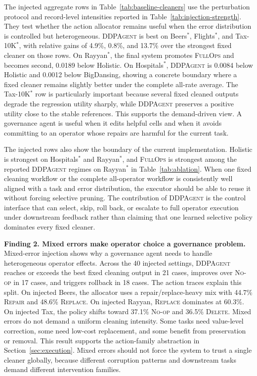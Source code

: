 \documentclass[sigconf, nonacm]{acmart}
\newcommand{\sys}{\textsc{DDPAgent}\xspace}
\newcommand{\noop}{\textsc{No-op}\xspace}
\newcommand{\repair}{\textsc{Repair}\xspace}
\newcommand{\deleteop}{\textsc{Delete}\xspace}
\newcommand{\replaceop}{\textsc{Replace}\xspace}
\newcommand{\fullops}{\textsc{FullOps}\xspace}
\begin{document}
The injected aggregate rows in Table~\ref{tab:baseline-cleaners} use the perturbation protocol and record-level intensities reported in Table~\ref{tab:injection-strength}. They test whether the action allocator remains useful when the error distribution is controlled but heterogeneous. \sys is best on Beers$^*$, Flights$^*$, and Tax-10K$^*$, with relative gains of 4.9\%, 0.8\%, and 13.7\% over the strongest fixed cleaner on those rows. On Rayyan$^*$, the final system promotes \fullops and becomes second, 0.0189 below Holistic. On Hospitals$^*$, \sys is 0.0084 below Holistic and 0.0012 below BigDansing, showing a concrete boundary where a fixed cleaner remains slightly better under the complete all-rate average. The Tax-10K$^*$ row is particularly important because several fixed cleaned outputs degrade the regression utility sharply, while \sys preserves a positive utility close to the stable references. This supports the demand-driven view. A governance agent is useful when it edits helpful cells and when it avoids committing to an operator whose repairs are harmful for the current task.

The injected rows also show the boundary of the current implementation. Holistic is strongest on Hospitals$^*$ and Rayyan$^*$, and \fullops is strongest among the reported \sys regimes on Rayyan$^*$ in Table~\ref{tab:ablation}. When one fixed cleaning workflow or the complete all-operator workflow is consistently well aligned with a task and error distribution, the executor should be able to reuse it without forcing selective pruning. The contribution of \sys is the control interface that can select, skip, roll back, or escalate to full operator execution under downstream feedback rather than claiming that one learned selective policy dominates every fixed cleaner.

\textbf{Finding 2. Mixed errors make operator choice a governance problem.}
Mixed-error injection shows why a governance agent needs to handle heterogeneous operator effects. Across the 40 injected settings, \sys reaches or exceeds the best fixed cleaning output in 21 cases, improves over \noop in 17 cases, and triggers rollback in 18 cases. The action traces explain this split. On injected Beers, the allocator uses a repair/replace-heavy mix with 44.7\% \repair and 48.6\% \replaceop. On injected Rayyan, \replaceop dominates at 60.3\%. On injected Tax, the policy shifts toward 37.1\% \noop and 36.5\% \deleteop. Mixed errors do not demand a uniform cleaning intensity. Some tasks need value-level correction, some need low-cost replacement, and some benefit from preservation or removal. This result supports the action-family abstraction in Section~\ref{sec:execution}. Mixed errors should not force the system to trust a single cleaner globally, because different corruption patterns and downstream tasks demand different intervention families.
\end{document}
